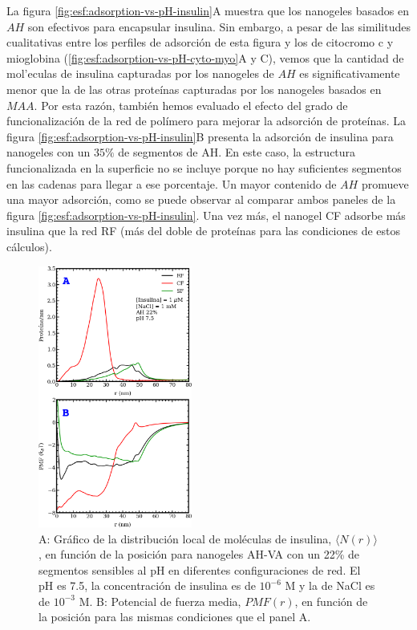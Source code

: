 La figura \ref{fig:esf:adsorption-vs-pH-insulin}A muestra que los nanogeles basados en $AH$ son efectivos para encapsular insulina.
Sin embargo, a pesar de las similitudes cualitativas entre los perfiles de adsorci\'on de esta figura y los de citocromo c y mioglobina (\ref{fig:esf:adsorption-vs-pH-cyto-myo}A y C), vemos que la cantidad de mol'eculas de insulina capturadas por los nanogeles de $AH$ es significativamente menor que la de las otras prote\'inas capturadas por los nanogeles basados en $MAA$.
Por esta raz\'on, tambi\'en hemos evaluado el efecto del grado de funcionalizaci\'on de la red de pol\'imero para mejorar la adsorci\'on de prote\'inas.
La figura \ref{fig:esf:adsorption-vs-pH-insulin}B presenta la adsorci\'on de insulina para nanogeles con un $35\%$ de segmentos de AH.
En este caso, la estructura funcionalizada en la superficie no se incluye porque no hay suficientes segmentos en las cadenas para llegar a ese porcentaje.
Un mayor contenido de $AH$ promueve una mayor adsorci\'on, como se puede observar al comparar ambos paneles de la figura \ref{fig:esf:adsorption-vs-pH-insulin}.
Una vez m\'as, el nanogel CF adsorbe m\'as insulina que la red RF (m\'as del doble de prote\'inas para las condiciones de estos c\'alculos).




\begin{figure}[!htb]
    \centering
    \includegraphics[width=0.45\textwidth]{Figures/graphs-gel2/insu-ads-pmf.pdf}
    \caption{A: Gr\'afico de la distribuci\'on local de mol\'eculas de insulina, $\langle N(r) \rangle$, en funci\'on de la posici\'on para nanogeles AH-VA con un 22\% de segmentos sensibles al pH en diferentes configuraciones de red.
    	El pH es 7.5, la concentraci\'on de insulina es de $10^{-6}$ M y la de NaCl es de $10^{-3}$ M.
    	B: Potencial de fuerza media, ${PMF}(r)$, en funci\'on de la posici\'on para las mismas condiciones que el panel A.}
    \label{fig:esf:adsorption-vs-r-insulin}
\end{figure}



